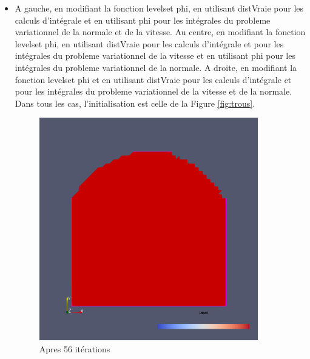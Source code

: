 \documentclass[11pt,a4paper]{article}
\begin{document}
\begin{itemize}
	
	\item A gauche, en modifiant la fonction levelset phi, en utilisant distVraie pour les calculs d'intégrale et en utilisant phi pour les intégrales du probleme variationnel de la normale et de la vitesse. Au centre,  en modifiant la fonction levelset phi, en utilisant distVraie pour les calculs d'intégrale et pour les intégrales du probleme variationnel de la vitesse et en utilisant phi pour les intégrales du probleme variationnel de la normale. A droite, en modifiant la fonction levelset phi et en utilisant distVraie pour les calculs d'intégrale et pour les intégrales du probleme variationnel de la vitesse et de la normale. Dans tous les cas, l'initialisation est celle de la Figure \ref{fig:trous}.
	\begin{figure}[H]
		\begin{minipage}{0.3\textwidth}
			\includegraphics[width=0.9\textwidth]{SansEl2Dphinorm1vel1.png}
			\caption{Apres 56 itérations}
		\end{minipage}	
		\begin{minipage}{0.3\textwidth}

\end{minipage}
\end{figure}
\end{itemize}
\end{document}
